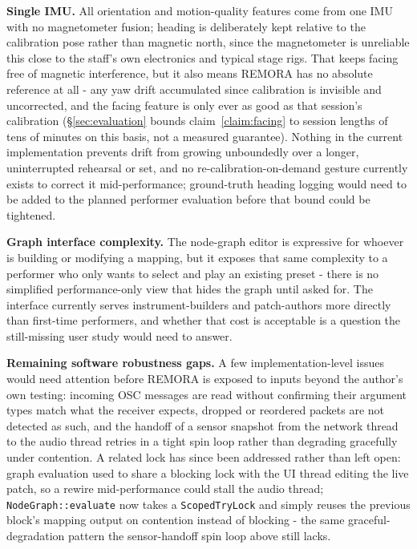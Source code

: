 \documentclass[sigconf,nonacm]{acmart}
\begin{document}
\textbf{Single IMU.} All orientation and motion-quality features come from one IMU with no
magnetometer fusion; heading is deliberately kept relative to the calibration pose rather than
magnetic north, since the magnetometer is unreliable this close to the staff's own electronics and
typical stage rigs. That keeps facing free of magnetic interference, but it also means REMORA has no
absolute reference at all - any yaw drift accumulated since calibration is invisible and
uncorrected, and the facing feature is only ever as good as that session's calibration
(\S\ref{sec:evaluation} bounds claim~\ref{claim:facing} to session lengths of tens of minutes on this basis, not a
measured guarantee). Nothing in the current implementation prevents drift from growing unboundedly
over a longer, uninterrupted rehearsal or set, and no re-calibration-on-demand gesture currently
exists to correct it mid-performance; ground-truth heading logging would need to be added to the
planned performer evaluation before that bound could be tightened.

\textbf{Graph interface complexity.} The node-graph editor is expressive for whoever is building or
modifying a mapping, but it exposes that same complexity to a performer who only wants to select and
play an existing preset - there is no simplified performance-only view that hides the graph until
asked for. The interface currently serves instrument-builders and patch-authors more directly than
first-time performers, and whether that cost is acceptable is a question the still-missing user
study would need to answer.

\textbf{Remaining software robustness gaps.} A few implementation-level issues would need attention
before REMORA is exposed to inputs beyond the author's own testing: incoming OSC messages are read
without confirming their argument types match what the receiver expects, dropped or reordered
packets are not detected as such, and the handoff of a sensor snapshot from the network thread to
the audio thread retries in a tight spin loop rather than degrading gracefully under contention. A
related lock has since been addressed rather than left open: graph evaluation used to share a
blocking lock with the UI thread editing the live patch, so a rewire mid-performance could stall the
audio thread; \texttt{NodeGraph::evaluate} now takes a \texttt{ScopedTryLock} and simply reuses the
previous block's mapping output on contention instead of blocking - the same graceful-degradation
pattern the sensor-handoff spin loop above still lacks.
\end{document}
